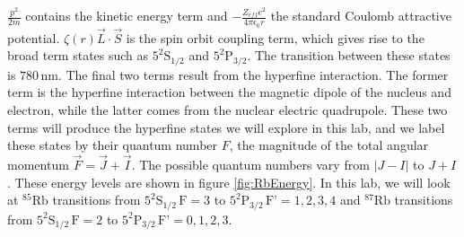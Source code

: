 \documentclass[12pt]{article}
\begin{document}
$\frac{p^2}{2m}$ contains the kinetic energy term and $- \frac{Z_{eff} e^2}{4 \pi \epsilon_0 r}$ the standard Coulomb attractive potential.  $\zeta(r) \vec{L}\cdot \vec{S}$ is the spin orbit coupling term, which gives rise to the broad term states such as $5^2\text{S}_{1/2}$ and $5^2\text{P}_{3/2}$.  The transition between these states is $780\,\text{nm}$.  The final two terms result from the hyperfine interaction.  The former term is the hyperfine interaction between the magnetic dipole of the nucleus and electron, while the latter comes from the nuclear electric quadrupole.  These two terms will produce the hyperfine states we will explore in this lab, and we label these states by their quantum number $F$, the magnitude of the total angular momentum $\vec{F} = \vec{J} + \vec{I}$.  The possible quantum numbers vary from $\rvert J-I\rvert$ to $J+I$.  These energy levels are shown in figure \ref{fig:RbEnergy}.  In this lab, we will look at ${}^{85}\text{Rb}$ transitions from $5^2\text{S}_{1/2}\,\text{F}=3$ to $5^2\text{P}_{3/2}\, \text{F'}=1,2,3,4$ and ${}^{87}\text{Rb}$ transitions from $5^2\text{S}_{1/2}\,\text{F}=2$ to $5^2\text{P}_{3/2}\, \text{F'}=0,1,2,3$.
\end{document}

